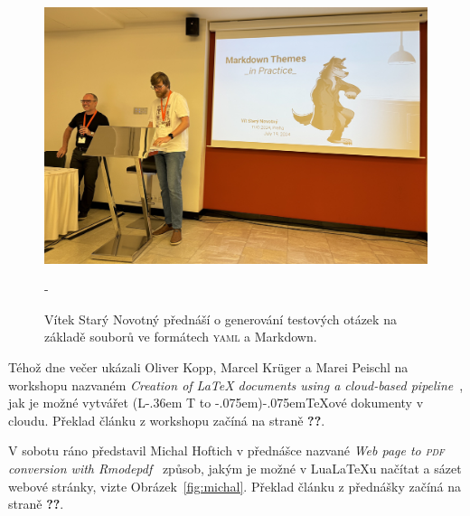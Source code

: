 \documentclass{csbulletin}
\makeatletter
\newcommand\acro[1]{\textsc{\MakeLowercase{#1}}}
\DeclareRobustCommand{\La}{L\kern-.36em%
        {\sbox\z@ T%
         \vbox to\ht\z@{\hbox{\check@mathfonts
                              \fontsize\sf@size\z@
                              \math@fontsfalse\selectfont
                              A}%
                        \vss}%
        }}
\def\AllTeX{(\La\kern-.075em)\kern-.075em\TeX}
\def\strankasclankem#1#2{\textbf{??}}
\makeatother
\begin{document}
\begin{figure}[p]
\centering
\includegraphics[width=\linewidth]{figs/vitek-pred-prednaskou}\par\medskip
\fboxsep=0pt\kern-\fboxrule\relax{}%
\caption{Vítek Starý Novotný přednáší o generování testových otázek na základě souborů ve formátech \acro{YAML} a Markdown.}
\label{fig:vitek}
\end{figure}

Téhož dne večer ukázali Oliver Kopp, Marcel Krüger a Marei Peischl na workshopu nazvaném \emph{\foreignlanguage{english}{Creation of \LaTeX{} documents using a cloud-based pipeline}}~\cite{peischl2024pipeline}, jak je možné vytvářet \AllTeX ové dokumenty v cloudu. Překlad článku z workshopu začíná na straně \strankasclankem{Peischl-pipeline}{peischl-pipeline}.

V sobotu ráno představil Michal Hoftich v přednášce nazvané \emph{\foreignlanguage{english}{Web page to \acro{PDF} conversion with Rmodepdf}}~\cite{hoftich2024weba, hoftich2024webc} způsob, jakým je možné v Lua\LaTeX u načítat a sázet webové stránky, vizte Obrázek~\ref{fig:michal}. Překlad článku z přednášky začíná na straně \strankasclankem{Hoftich-Responsive}{responsive_latex_hoftich}.
\end{document}
